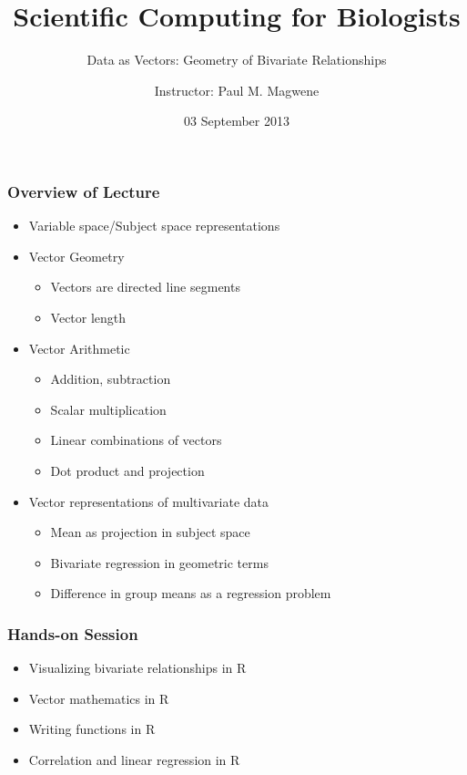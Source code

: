 \documentclass{beamer}
\title{Scientific Computing for Biologists}
\subtitle{Data as Vectors: Geometry of Bivariate Relationships} %
\author[P. Magwene]{Instructor: Paul M. Magwene}
\date{03 September 2013}
\begin{document}
\begin{frame}
\titlepage
\end{frame}

\begin{frame}
  \frametitle{Overview of Lecture}

\begin{itemize}
        \item Variable space/Subject space representations
		\item Vector Geometry
		\begin{itemize}
			\item Vectors are directed line segments
			\item Vector length
		\end{itemize}
		\item Vector Arithmetic
		\begin{itemize}
			\item Addition, subtraction
			\item Scalar multiplication
			\item Linear combinations of vectors
			\item Dot product and projection
		\end{itemize}
		\item Vector representations of multivariate data
        \begin{itemize}
			\item Mean as projection in subject space
			\item Bivariate regression in geometric terms
			\item Difference in group means as a regression problem
		\end{itemize}
\end{itemize}

\end{frame}

\begin{frame}
  \frametitle{Hands-on Session}
		\begin{itemize}
          \item Visualizing bivariate relationships in R
		  \item Vector mathematics in R
		  \item Writing functions in R
		  \item Correlation and linear regression in R
	 \end{itemize}
\end{frame}
\end{document}

